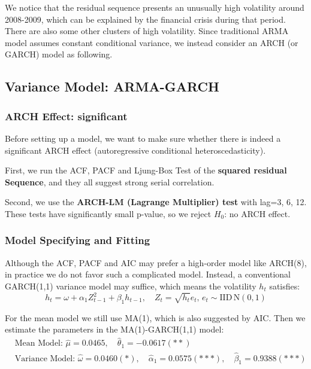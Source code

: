 \documentclass[aps,pre,12pt,preprint,onecolumn,showpacs,showkeys]{revtex4-1}
\begin{document}
            We notice that the residual sequence presents an unusually high volatility around 2008-2009, which can be explained by the financial crisis during that period. There are also some other clusters of high volatility. Since traditional ARMA model assumes constant conditional variance, we instead consider an ARCH (or GARCH) model as following.

    \subsection{Variance Model: ARMA-GARCH}
        \subsubsection{ARCH Effect: significant}
            Before setting up a model, we want to make sure whether there is indeed a significant ARCH effect (autoregressive conditional heteroscedasticity).
            
            First, we run the ACF, PACF and Ljung-Box Test of the \textbf{squared residual Sequence}, and they all suggest strong serial correlation. 
            
            Second, we use the \textbf{ARCH-LM (Lagrange Multiplier) test} with lag=3, 6, 12. These tests have significantly small p-value, so we reject $H_0$: no ARCH effect.
        
        \subsubsection{Model Specifying and Fitting}
        Although the ACF, PACF and AIC may prefer a high-order model like ARCH(8), in practice we do not favor such a complicated model. Instead, a conventional GARCH(1,1) variance model may suffice, which means the volatility $h_t$ satisfies:
        \begin{equation}
            h_t = \omega + \alpha _1 Z_{t-1}^2 +\beta _1 h_{t-1}, \quad Z_t=\sqrt{h_t} e_t,\, e_t \sim \mathrm{IID}\, \mathrm{N}(0,1)  
        \end{equation}

        For the mean model we still use MA(1), which is also suggested by AIC. Then we estimate the parameters in the MA(1)-GARCH(1,1) model: 
        \begin{align}
            &\textrm{Mean Model: } \hat \mu=0.0465, \quad \hat \theta _1 =-0.0617 (**) \\
            &\textrm{Variance Model: } \hat \omega =0.0460 (*), \quad \hat \alpha _1=0.0575(***),\quad \hat \beta _1=0.9388(***)
        \end{align}
\end{document}
